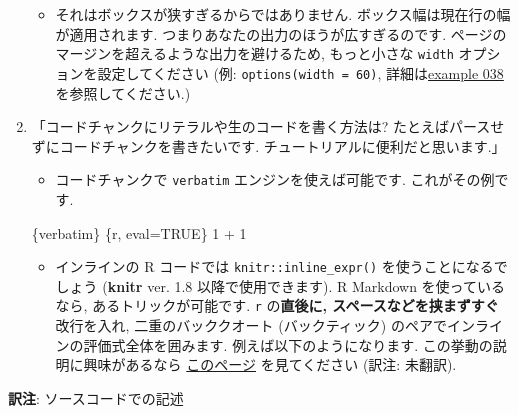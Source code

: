 \documentclass[
  lualatex,ja=standard,jafont=noto-otf]{bxjsreport}
\newenvironment{Shaded}{\begin{snugshade}}{\end{snugshade}}
\newcommand{\NormalTok}[1]{#1}
\providecommand{\tightlist}{%
  \setlength{\itemsep}{0pt}\setlength{\parskip}{0pt}}
\begin{document}
\begin{enumerate}
  \begin{itemize}
  \tightlist
  \item
    それはボックスが狭すぎるからではありません.
    ボックス幅は現在行の幅が適用されます.
    つまりあなたの出力のほうが広すぎるのです.
    ページのマージンを超えるような出力を避けるため, もっと小さな
    \texttt{width} オプションを設定してください (例:
    \texttt{options(width\ =\ 60)},
    詳細は\href{https://github.com/yihui/knitr-examples/blob/master/038-output-width.Rnw}{example
    038} を参照してください.)
  \end{itemize}
\item
  「コードチャンクにリテラルや生のコードを書く方法は?
  たとえばパースせずにコードチャンクを書きたいです.
  チュートリアルに便利だと思います.」

  \begin{itemize}
  \tightlist
  \item
    コードチャンクで \texttt{verbatim} エンジンを使えば可能です.
    これがその例です.
  \end{itemize}

\begin{Shaded}
\begin{Highlighting}[numbers=left,,]
\NormalTok{\textasciigrave{}\textasciigrave{}\textasciigrave{}\textasciigrave{}\{verbatim\}}
\NormalTok{\textasciigrave{}\textasciigrave{}\textasciigrave{}\{r, eval=TRUE\}}
\NormalTok{1 + 1}
\NormalTok{\textasciigrave{}\textasciigrave{}\textasciigrave{}}
\NormalTok{\textasciigrave{}\textasciigrave{}\textasciigrave{}\textasciigrave{}}
\end{Highlighting}
\end{Shaded}

  \begin{itemize}
  \tightlist
  \item
    インラインの R コードでは \texttt{knitr::inline\_expr()}
    を使うことになるでしょう (\textbf{knitr} ver. 1.8
    以降で使用できます). R Markdown を使っているなら,
    あるトリックが可能です. \texttt{\textasciigrave{}r}
    の\textbf{直後に, スペースなどを挟まずすぐ}改行を入れ,
    二重のバッククオート (バックティック)
    のペアでインラインの評価式全体を囲みます.
    例えば以下のようになります. この挙動の説明に興味があるなら
    \href{https://yihui.org/en/2017/11/knitr-verbatim-code-chunk/}{このページ}
    を見てください (訳注: 未翻訳).
  \end{itemize}
\end{enumerate}

\textbf{訳注}: ソースコードでの記述
\end{document}

